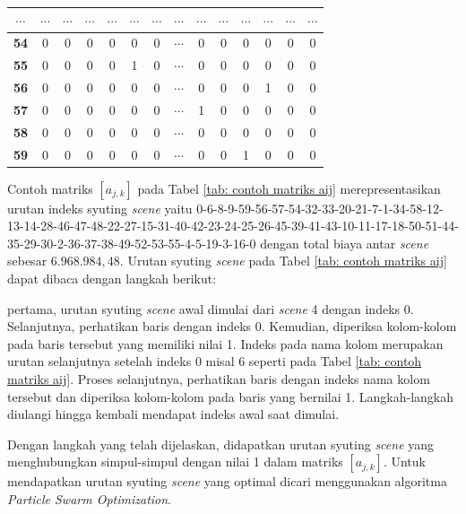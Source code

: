 {{{\begin{tabularx}{\textwidth}{|c|c|c|c|c|c|c|c|c|c|c|c|c|c|}
        \textbf{$\cdots$} & $\cdots$   & $\cdots$   & $\cdots$   & $\cdots$   & $\cdots$   & $\cdots$   & $\cdots$          & $\cdots$    & $\cdots$    & $\cdots$    & $\cdots$    & $\cdots$    & $\cdots$    \\ \hline
        \textbf{54}       & 0          & 0          & 0          & 0          & 0          & 0          & $\cdots$          & 0           & 0           & 0           & 0           & 0           & 0           \\ \hline
        \textbf{55}       & 0          & 0          & 0          & 0          & 1          & 0          & $\cdots$          & 0           & 0           & 0           & 0           & 0           & 0           \\ \hline
        \textbf{56}       & 0          & 0          & 0          & 0          & 0          & 0          & $\cdots$          & 0           & 0           & 0           & 1           & 0           & 0           \\ \hline
        \textbf{57}       & 0          & 0          & 0          & 0          & 0          & 0          & $\cdots$          & 1           & 0           & 0           & 0           & 0           & 0           \\ \hline
        \textbf{58}       & 0          & 0          & 0          & 0          & 0          & 0          & $\cdots$          & 0           & 0           & 0           & 0           & 0           & 0           \\ \hline
        \textbf{59}       & 0          & 0          & 0          & 0          & 0          & 0          & $\cdots$          & 0           & 0           & 1           & 0           & 0           & 0           \\ \hline
    \end{tabularx}
}

Contoh matriks $[a_{j,k}]$ pada Tabel \ref{tab: contoh matriks aij} merepresentasikan urutan indeks syuting \textit{scene} yaitu 0-6-8-9-59-56-57-54-32-33-20-21-7-1-34-58-12-13-14-28-46-47-48-22-27-15-31-40-42-23-24-25-26-45-39-41-43-10-11-17-18-50-51-44-35-29-30-2-36-37-38-49-52-53-55-4-5-19-3-16-0
dengan total biaya antar \textit{scene} sebesar $6.968.984,48$.
Urutan syuting \textit{scene} pada Tabel \ref{tab: contoh matriks aij} dapat dibaca dengan langkah berikut:

\noindent
pertama, urutan syuting \textit{scene} awal dimulai dari \textit{scene} 4 dengan indeks 0.
Selanjutnya, perhatikan baris dengan indeks 0.
Kemudian, diperiksa kolom-kolom pada baris tersebut yang memiliki nilai 1.
Indeks pada nama kolom merupakan urutan selanjutnya setelah indeks 0 misal 6 seperti pada Tabel \ref{tab: contoh matriks aij}.
Proses selanjutnya, perhatikan baris dengan indeks nama kolom tersebut dan diperiksa kolom-kolom pada baris yang bernilai 1.
Langkah-langkah diulangi hingga kembali mendapat indeks awal saat dimulai.

\noindent
Dengan langkah yang telah dijelaskan, didapatkan urutan syuting \textit{scene} yang menghubungkan simpul-simpul dengan nilai 1 dalam matriks $[a_{j,k}]$.
Untuk mendapatkan urutan syuting \textit{scene} yang optimal dicari menggunakan algoritma \textit{Particle Swarm Optimization}.
}
}
